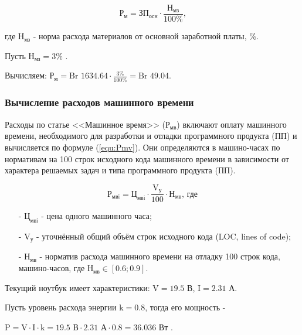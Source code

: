 \begin{equation}
    \label{equ:Rm}
    \text{Р}_\text{м} = \text{ЗП}_\text{осн} \cdot \frac{ \text{Н}_\text{мз} }{ 100\% } \text{,}
\end{equation}

где $\text{Н}_\text{мз}$ - норма расхода материалов от основной заработной платы, \%.

Пусть $\text{Н}_\text{мз} = 3\%$ \cite{economicNormaRashodaMaterialovVMetodichke}.

Вычисляем: $\text{Р}_\text{м} = \text{Br } 1634.64 \cdot \frac{ 3\% }{ 100\% } = \text{Br } 49.04$.

\subsubsection*{Вычисление расходов машинного времени}

Расходы по статье <<Машинное время>> ($\text{Р}_\text{мв}$) включают оплату машинного времени,
необходимого для разработки и отладки программного продукта (ПП) и вычисляется по формуле (\ref{equ:Pmv}).
Они определяются в машино-часах по нормативам на 100 строк исходного кода машинного времени
в зависимости от характера решаемых задач и типа программного продукта (ПП).

\begin{equation}
    \label{equ:Pmv}
    \text{Р}_\text{мвi} = \text{Ц}_\text{мвi} \cdot \frac{ \text{V}_\text{у} }{ 100 } \cdot \text{Н}_\text{мв} \text{, где}
\end{equation}

\begin{enumerate}
    \item[-] $\text{Ц}_\text{мвi}$ - цена одного машинного часа; 
    \item[-] $\text{V}_\text{у}$ - уточнённый общий объём строк исходного кода (LOC, lines of code);
    \item[-] $\text{Н}_\text{мв}$ - норматив расхода машинного времени на отладку 100 строк кода, машино-часов,
    где $\text{Н}_\text{мв} \in [0.6; 0.9]$.
\end{enumerate}

Текущий ноутбук имеет характеристики: $\text{V} = 19.5 \text{ В}$, $\text{I} = 2.31 \text{ А}$.

Пусть уровень расхода энергии $\text{k} = 0.8$, тогда его мощность -

$\text{P} = \text{V} \cdot \text{I} \cdot \text{k} = 19.5 \text{ В} \cdot 2.31 \text{ А} \cdot 0.8 = 36.036 \text{ Вт}$ \cite{economicCkolkoPotreblaetEnergiiNoutbyk}.

